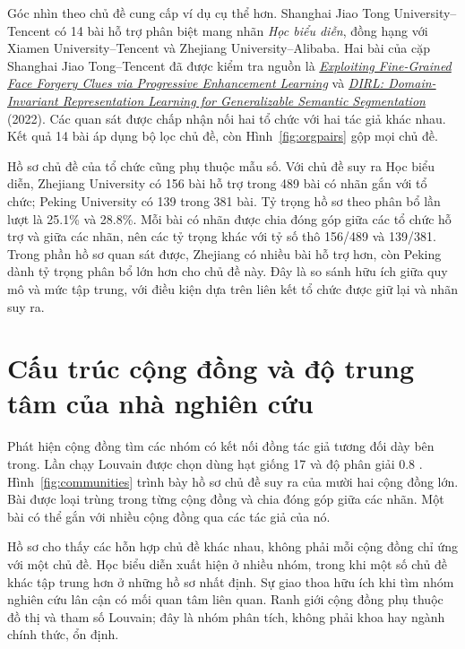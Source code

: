 Góc nhìn theo chủ đề cung cấp ví dụ cụ thể hơn. Shanghai Jiao Tong
University--Tencent có 14 bài hỗ trợ phân biệt mang nhãn \emph{Học biểu diễn},
đồng hạng với Xiamen University--Tencent và Zhejiang University--Alibaba. Hai
bài của cặp Shanghai Jiao Tong--Tencent đã được kiểm tra nguồn là
\href{https://doi.org/10.1609/aaai.v36i1.19954}{\emph{Exploiting Fine-Grained
Face Forgery Clues via Progressive Enhancement Learning}} và
\href{https://doi.org/10.1609/aaai.v36i3.20193}{\emph{DIRL: Domain-Invariant
Representation Learning for Generalizable Semantic Segmentation}} (2022).
Các quan sát được chấp nhận nối hai tổ chức với hai tác giả khác nhau.
Kết quả 14 bài áp dụng bộ lọc chủ đề, còn Hình~\ref{fig:orgpairs} gộp mọi chủ đề.

Hồ sơ chủ đề của tổ chức cũng phụ thuộc mẫu số. Với chủ đề suy ra Học biểu
diễn, Zhejiang University có 156 bài hỗ trợ trong 489 bài có nhãn gắn với tổ
chức; Peking University có 139 trong 381 bài. Tỷ trọng hồ sơ theo phân bổ lần
lượt là 25.1\% và 28.8\%. Mỗi bài có nhãn được chia đóng góp giữa các tổ chức
hỗ trợ và giữa các nhãn, nên các tỷ trọng khác với tỷ số thô 156/489 và
139/381. Trong phần hồ sơ quan sát được, Zhejiang có nhiều bài hỗ trợ hơn,
còn Peking dành tỷ trọng phân bổ lớn hơn cho chủ đề này. Đây là so sánh hữu
ích giữa quy mô và mức tập trung, với điều kiện dựa trên liên kết tổ chức được
giữ lại và nhãn suy ra.

\section{Cấu trúc cộng đồng và độ trung tâm của nhà nghiên cứu}
\label{sec:centrality}
Phát hiện cộng đồng tìm các nhóm có kết nối đồng tác giả tương đối dày bên
trong. Lần chạy Louvain được chọn dùng hạt giống 17 và độ phân giải 0.8
\citep{blondel2008communities}. Hình~\ref{fig:communities} trình bày hồ sơ chủ
đề suy ra của mười hai cộng đồng lớn. Bài được loại trùng trong từng cộng đồng
và chia đóng góp giữa các nhãn. Một bài có thể gắn với nhiều cộng đồng qua các
tác giả của nó.

\FloatBarrier

Hồ sơ cho thấy các hỗn hợp chủ đề khác nhau, không phải mỗi cộng đồng chỉ ứng
với một chủ đề. Học biểu diễn xuất hiện ở nhiều nhóm, trong khi một số chủ đề
khác tập trung hơn ở những hồ sơ nhất định. Sự giao thoa hữu ích khi tìm nhóm
nghiên cứu lân cận có mối quan tâm liên quan. Ranh giới cộng đồng phụ thuộc
đồ thị và tham số Louvain; đây là nhóm phân tích, không phải khoa hay ngành
chính thức, ổn định.

